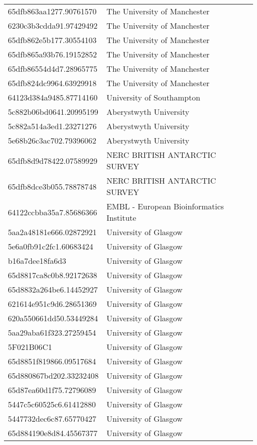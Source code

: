 \begin{tabular}{ll}
65dfb863aa1277.90761570 & The University of Manchester \\
6230c3b3cdda91.97429492 & The University of Manchester \\
65dfb862e5b177.30554103 & The University of Manchester \\
65dfb865a93b76.19152852 & The University of Manchester \\
65dfb86554d4d7.28965775 & The University of Manchester \\
65dfb824dc9964.63929918 & The University of Manchester \\
64123d384a9485.87714160 & University of Southampton \\
5c882b06bd0641.20995199 & Aberystwyth University \\
5c882a514a3ed1.23271276 & Aberystwyth University \\
5e68b26c3ac702.79396062 & Aberystwyth University \\
65dfb8d9d78422.07589929 & NERC BRITISH ANTARCTIC SURVEY \\
65dfb8dce3b055.78878748 & NERC BRITISH ANTARCTIC SURVEY \\
64122ccbba35a7.85686366 & EMBL - European Bioinformatics Institute \\
5aa2a48181e666.02872921 & University of Glasgow \\
5e6a0fb91c2fc1.60683424 & University of Glasgow \\
b16a7dee18fa6d3 & University of Glasgow \\
65d8817ca8c0b8.92172638 & University of Glasgow \\
65d8832a264be6.14452927 & University of Glasgow \\
621614e951c9d6.28651369 & University of Glasgow \\
620a550661dd50.53449284 & University of Glasgow \\
5aa29aba61f323.27259454 & University of Glasgow \\
5F021B06C1 & University of Glasgow \\
65d8851f819866.09517684 & University of Glasgow \\
65d880867bd202.33232408 & University of Glasgow \\
65d87ea60d1f75.72796089 & University of Glasgow \\
5447c5c60525c6.61412880 & University of Glasgow \\
5447732dec6c87.65770427 & University of Glasgow \\
65d884190e8d84.45567377 & University of Glasgow \\

\end{tabular}
